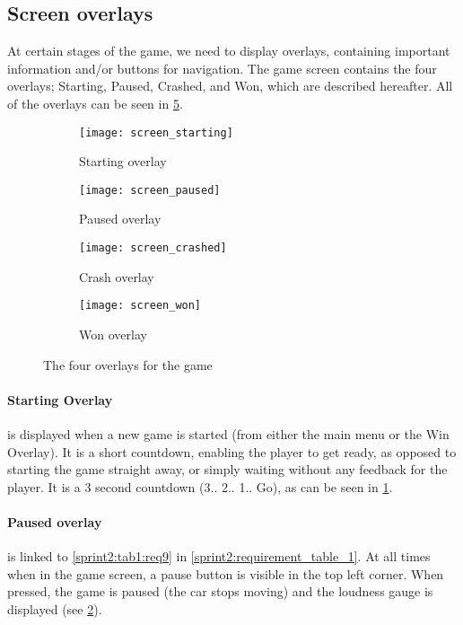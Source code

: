 \subsection{Screen overlays}
At certain stages of the game, we need to display overlays, containing important information and/or buttons for navigation.
The game screen contains the four overlays; Starting, Paused, Crashed, and Won, which are described hereafter.
All of the overlays can be seen in \cref{sprint2:overlays:fig}.

\begin{figure}[h]
	\centering
    \begin{subfigure}[b]{0.49\textwidth}
            \texttt{[image: screen\_starting]}
            \caption{Starting overlay}
            \label{sprint2:overlays:fig:starting}
    \end{subfigure}
    \begin{subfigure}[b]{0.49\textwidth}
            \texttt{[image: screen\_paused]}
            \caption{Paused overlay}
            \label{sprint2:overlays:fig:paused}
    \end{subfigure}
    \begin{subfigure}[b]{0.49\textwidth}
            \texttt{[image: screen\_crashed]}
            \caption{Crash overlay}
            \label{sprint2:overlays:fig:crashed}
    \end{subfigure}
    \begin{subfigure}[b]{0.49\textwidth}
            \texttt{[image: screen\_won]}
            \caption{Won overlay}
            \label{sprint2:overlays:fig:won}
    \end{subfigure}
    \caption{The four overlays for the game}
    \label{sprint2:overlays:fig}
\end{figure}

\paragraph{Starting Overlay} is displayed when a new game is started (from either the main menu or the Win Overlay).
It is a short countdown, enabling the player to get ready, as opposed to starting the game straight away, or simply waiting without any feedback for the player.
It is a 3 second countdown (3.. 2.. 1.. Go), as can be seen in \cref{sprint2:overlays:fig:starting}.

\paragraph{Paused overlay}\label{sprint2:paused} is linked to \cref{sprint2:tab1:req9} in \cref{sprint2:requirement_table_1}.
At all times when in the game screen, a pause button is visible in the top left corner.
When pressed, the game is paused (the car stops moving) and the loudness gauge is displayed (see \cref{sprint2:overlays:fig:paused}).

